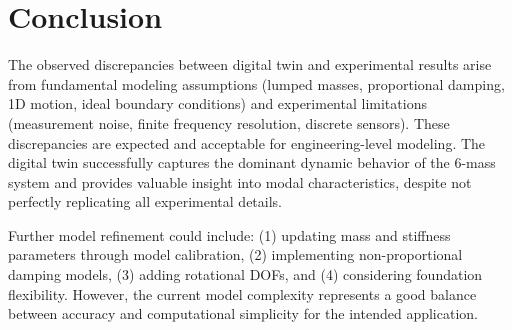 \documentclass[11pt,a4paper]{article}
\begin{document}
\section{Conclusion}

The observed discrepancies between digital twin and experimental results arise from fundamental modeling assumptions (lumped masses, proportional damping, 1D motion, ideal boundary conditions) and experimental limitations (measurement noise, finite frequency resolution, discrete sensors). These discrepancies are expected and acceptable for engineering-level modeling. The digital twin successfully captures the dominant dynamic behavior of the 6-mass system and provides valuable insight into modal characteristics, despite not perfectly replicating all experimental details.

Further model refinement could include: (1) updating mass and stiffness parameters through model calibration, (2) implementing non-proportional damping models, (3) adding rotational DOFs, and (4) considering foundation flexibility. However, the current model complexity represents a good balance between accuracy and computational simplicity for the intended application.
\end{document}
